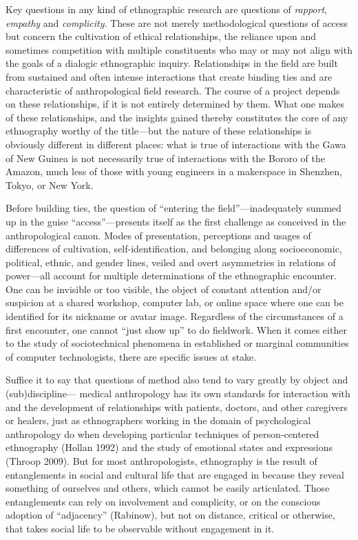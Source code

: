 \documentclass[10pt,letter,oneside]{scrartcl}
\begin{document}
Key questions in any kind of ethnographic research are questions of
\emph{rapport}, \emph{empathy} and \emph{complicity}.  These are not
merely methodological questions of access but concern the cultivation
of ethical relationships, the reliance upon and sometimes competition
with multiple constituents who may or may not align with the goals of 
a dialogic ethnographic inquiry. Relationships in the field are built 
from sustained and often intense interactions that create binding ties 
and are characteristic of anthropological field research. The course of 
a project depends on these relationships, if it is not entirely 
determined by them.  What one makes of these relationships, and the 
insights gained thereby constitutes the core of any ethnography worthy 
of the title---but the nature of these relationships is obviously different 
in different places:  what is true of interactions with the Gawa of New 
Guinea is not necessarily true of interactions with the Bororo of the 
Amazon, much less of those with young engineers in a makerspace 
in Shenzhen, Tokyo, or New York.

Before building ties, the question of ``entering the field''---inadequately 
summed up in the guise ``access''---presents itself as the first challenge 
as conceived in the anthropological canon.  Modes of presentation, perceptions 
and usages of differences of cultivation, self-identification, and belonging 
along socioeconomic, political, ethnic, and gender lines, veiled and overt 
asymmetries in relations of power---all account for multiple determinations of 
the ethnographic encounter. One can be invisible or too visible, the object 
of constant attention and/or suspicion at a shared workshop, computer lab, or
online space where one can be identified for its nickname or avatar image.  
Regardless of the circumstances of a first encounter, one cannot ``just show up'' 
to do fieldwork.  When it comes either to the study of sociotechnical phenomena 
in established or marginal communities of computer technologists, there are 
specific issues at stake.
  
Suffice it to say that questions of method also tend to vary greatly by object 
and (sub)discipline--- medical anthropology has its own standards for
interaction with and the development of relationships with patients,
doctors, and other caregivers or healers, just as ethnographers working in
the domain of psychological anthropology do when developing particular
techniques of person-centered ethnography (Hollan 1992) and the study of 
emotional states and expressions (Throop 2009). But for most anthropologists, 
ethnography is the result of entanglements in social and cultural life that are 
engaged in because they reveal something of ourselves and others, which
cannot be easily articulated. Those entanglements can rely on involvement 
and complicity, or on the conscious adoption of ``adjacency'' (Rabinow), 
but not on distance, critical or otherwise, that takes social life to be 
observable without engagement in it.
\end{document}
